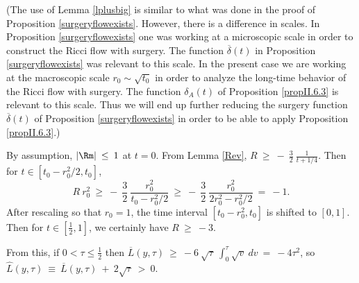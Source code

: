 (The use of Lemma \ref{lplusbig} is similar
to what was done in the proof of Proposition \ref{surgeryflowexists}.
However, there is a difference in scales.  In Proposition
\ref{surgeryflowexists} one was working at a microscopic scale
in order to construct the Ricci flow with surgery. The function
$\overline{\delta}(t)$ in Proposition \ref{surgeryflowexists} was relevant
to this scale. In the present
case we are working at the macroscopic scale $r_0 \sim \sqrt{t_0}$ in
order to analyze the long-time behavior of the Ricci flow with
surgery.  The function $\delta_A(t)$ of Proposition
\ref{propII.6.3} is relevant to this scale.  Thus we will end up further
reducing the surgery function $\overline{\delta}(t)$ of Proposition \ref{surgeryflowexists}
in order to be able to apply Proposition \ref{propII.6.3}.)


By assumption,
$|\Rm| \: \le \: 1$ at $t = 0$.
From Lemma \ref{Rev}, $R \: \ge \: - \: \frac32 \: \frac{1}{t+1/4}$.
Then for $t \in [t_0 - r_0^2/2, t_0]$,
\begin{equation}
R \: r_0^2 \: \ge \: - \: \frac32 \: \frac{r_0^2}{t_0 - r_0^2/2}
\: \ge \: - \: \frac32 \: \frac{r_0^2}{2r_0^2 - r_0^2/2} \: = \: -1.
\end{equation}
After rescaling so that $r_0 = 1$, the time interval
$[t_0 - r_0^2, t_0]$ is shifted to $[0, 1]$.
Then for $t \in [\frac12, 1]$, we certainly have
$R \: \ge \: -3$.

From this, if $0 < \tau \le \frac12$ then
$\overline{L}(y, \tau) \: \ge \: - 6 \: \sqrt{\tau} \:
\int_0^\tau \sqrt{v} \: dv \: = \: - 4 \tau^2$, so
$\hat{L}(y, \tau) \: \equiv \: \overline{L}(y, \tau) \: + \: 2 \sqrt{\tau}
\: > \: 0$.

